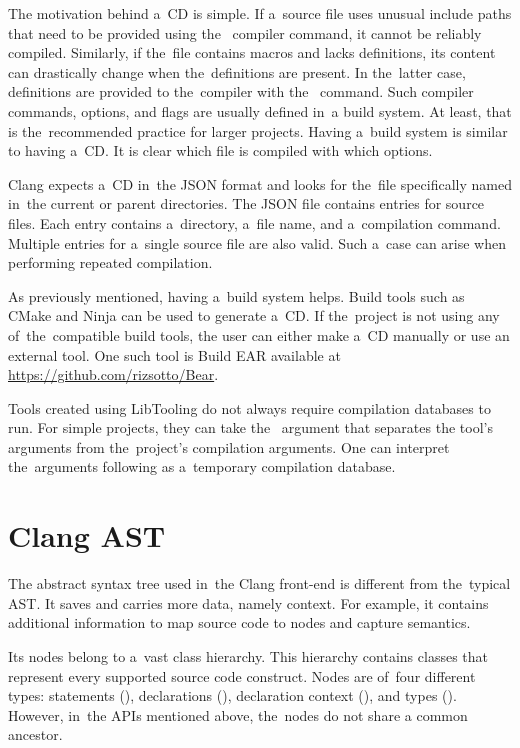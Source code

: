 The motivation behind a~CD is simple.
If a~source file uses unusual include paths that need to be provided 
using the~ compiler command, it cannot be reliably compiled.
Similarly, if the~file contains macros and lacks definitions, its content 
can drastically change when the~definitions are present.
In the~latter case, definitions are provided to the~compiler 
with the~ command.
Such compiler commands, options, and flags are usually defined in~a build 
system.
At least, that is the~recommended practice for larger projects.
Having a~build system is similar to having a~CD.
It is clear which file is compiled with which options.

Clang expects a~CD in~the JSON format and looks for the~file specifically
named   in~the current or parent 
directories.
The JSON file contains entries for source files.
Each entry contains a~directory, a~file name, and a~compilation command.
Multiple entries for a~single source file are also valid.
Such a~case can arise when performing repeated compilation.

As previously mentioned, having a~build system helps.
Build tools such as CMake and Ninja can be used to generate a~CD.
If the~project is not using any of~the~compatible build tools, 
the user can either make a~CD manually or use an external tool.
One such tool is Build EAR available at \url{https://github.com/rizsotto/Bear}.

Tools created using LibTooling do not always require compilation databases 
to run.
For simple projects, they can take the~\icode{-{}-} argument that separates 
the tool's arguments from the~project's compilation arguments.
One can interpret the~arguments following \icode{-{}-} as a~temporary
compilation database.

\section{Clang AST}

The abstract syntax tree used in~the Clang front-end \citep{ast:online}
is different from the~typical AST. 
It saves and carries more data, namely context.  
For example, it contains additional information to map source 
code to nodes and capture semantics. 

Its nodes belong to a~vast class hierarchy. 
This hierarchy contains classes that represent every supported 
source code construct.
Nodes are of~four different types: statements (), 
declarations (), declaration context (),
and types (). 
However, in~the APIs mentioned above, the~nodes do not share
a common ancestor.

